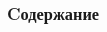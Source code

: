 
\begin{frame}[t]
	\frametitle{Cодержание} 
	{
		\begin{multicols}{2}
			\tableofcontents 
		\end{multicols}
	}
\end{frame}

